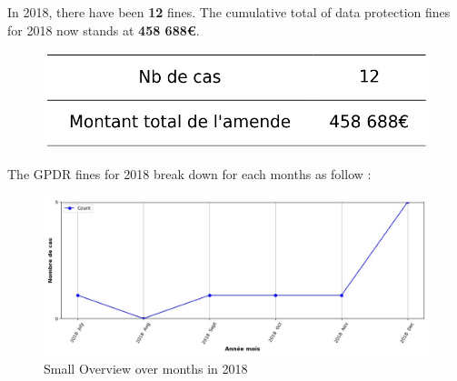 \documentclass[12pt]{article}
\begin{document}
	\begin{multicols}{2}
	
	In 2018, there have been \textbf{12} fines.
	The cumulative total of data protection fines for 2018 now stands at \textbf{458 688€}.
	
	\begin{figure}[H]
	\centering\includegraphics[width=1\linewidth]{graphs/counter_year}
	\end{figure}


	The GPDR fines for 2018 break down for each months as follow :

	\begin{figure}
	[H]\centering\includegraphics[width = 1.2\linewidth]{graphs/NbFinesPerMonth_year_graph}
	\caption{Small Overview over months in 2018}
	\end{figure}

	\end{multicols}
\end{document}
